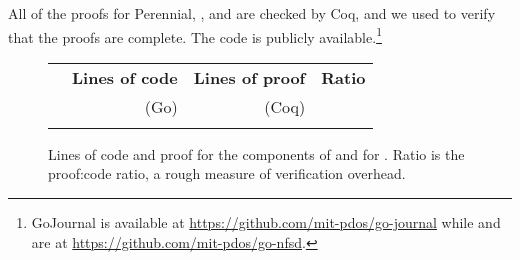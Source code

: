 All of the proofs for Perennial, \txn, and \simplenfs are checked by Coq, and we
used  to verify that the proofs are complete.  The
code is publicly available.\footnote{GoJournal is available at
\url{https://github.com/mit-pdos/go-journal} while \gnfs and \simplenfs are at
\url{https://github.com/mit-pdos/go-nfsd}.}


\begin{figure}
\centering
\small
\begin{tabular}{lrrr}
\toprule
  & \bf Lines of code & \bf Lines of proof & \bf Ratio \\
  & (Go) & (Coq) & \\
\midrule
   \\
\bottomrule
\end{tabular}
\caption{Lines of code and proof for the components of \txn and for
\simplenfs. Ratio is the proof:code ratio, a rough measure of verification overhead.}
\label{fig:loc}
\end{figure}



%
% 
%
%
% 
%
